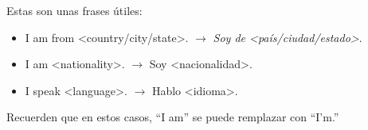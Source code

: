 Estas son unas frases útiles:
\begin{itemize}
	\item I am from <country/city/state>. $\rightarrow$ \emph{Soy de <país/ciudad/estado>}.
	\item I am <nationality>. $\rightarrow$ Soy <nacionalidad>.
	\item I speak <language>. $\rightarrow$ Hablo <idioma>.
\end{itemize}

Recuerden que en estos casos, ``I am'' se puede remplazar con ``I'm.''\\

